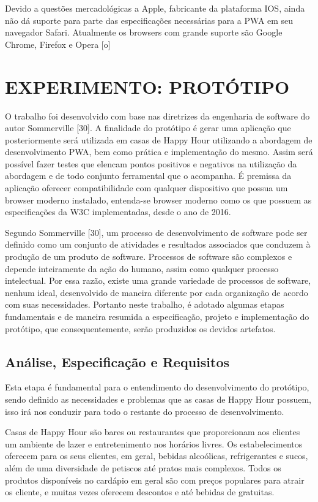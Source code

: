 Devido a questões mercadológicas a Apple, fabricante da plataforma IOS, ainda não dá suporte para parte das especificações necessárias para a PWA em seu navegador Safari. Atualmente os browsers com grande suporte são Google Chrome, Firefox e Opera [o]

\section{\esp EXPERIMENTO: PROTÓTIPO}

O trabalho foi desenvolvido com base nas diretrizes da engenharia de software do autor Sommerville [30]. A finalidade  do protótipo é gerar uma aplicação que posteriormente será utilizada em casas de Happy Hour utilizando a abordagem de desenvolvimento PWA, bem como prática e implementação do mesmo. Assim será possível fazer testes que elencam pontos positivos e negativos na utilização da abordagem e de todo conjunto ferramental que o acompanha. É premissa da aplicação oferecer compatibilidade com qualquer dispositivo que possua um browser moderno instalado, entenda-se browser moderno como os que possuem as especificações da W3C implementadas, desde o ano de 2016.

Segundo Sommerville [30], um processo de desenvolvimento de software pode ser definido como um conjunto de atividades e resultados associados que conduzem à produção de um produto de software. Processos de software são complexos e depende inteiramente da ação do humano, assim como qualquer processo intelectual. Por essa razão, existe uma grande variedade de processos de software, nenhum ideal, desenvolvido de maneira diferente por cada organização de acordo com suas necessidades. Portanto neste trabalho, é adotado algumas etapas fundamentais e de maneira resumida a especificação, projeto e implementação do protótipo, que consequentemente, serão produzidos os devidos artefatos.

\subsection{\esp Análise, Especificação e Requisitos}

Esta etapa é fundamental para o entendimento do desenvolvimento do protótipo, sendo definido as necessidades e problemas que as casas de Happy Hour possuem, isso irá nos conduzir para todo o restante do processo de desenvolvimento.

Casas de Happy Hour são bares ou restaurantes que proporcionam aos clientes um ambiente  de lazer e entretenimento  nos horários livres. Os estabelecimentos oferecem para os seus clientes, em geral, bebidas alcoólicas, refrigerantes e sucos, além de uma diversidade de petiscos até pratos mais complexos. Todos os produtos disponíveis no cardápio em geral são com preços populares para atrair os cliente, e muitas vezes oferecem descontos e até bebidas de gratuitas.

